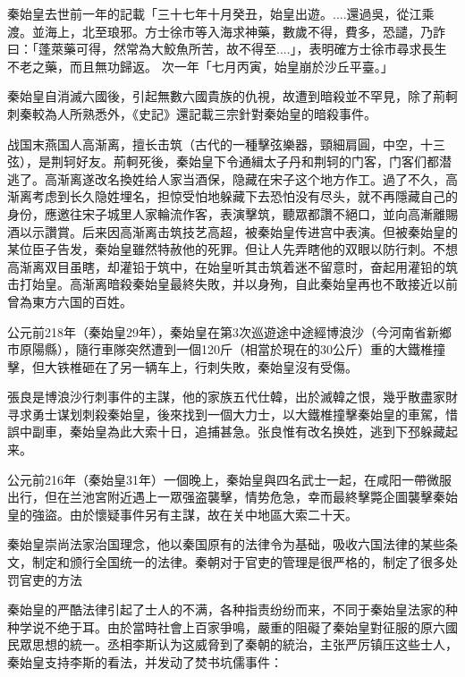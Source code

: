 秦始皇去世前一年的記載「三十七年十月癸丑，始皇出遊。....還過吳，從江乘渡。並海上，北至琅邪。方士徐市等入海求神藥，數歲不得，費多，恐譴，乃詐曰：「蓬萊藥可得，然常為大鮫魚所苦，故不得至....」，表明確方士徐市尋求長生不老之藥，而且無功歸返。 次一年「七月丙寅，始皇崩於沙丘平臺。」

秦始皇自消滅六國後，引起無數六國貴族的仇視，故遭到暗殺並不罕見，除了荊軻刺秦較為人所熟悉外，《史記》還記載三宗針對秦始皇的暗殺事件。

战国末燕国人高渐离，擅长击筑（古代的一種擊弦樂器，頸細肩圓，中空，十三弦），是荆轲好友。荊軻死後，秦始皇下令通緝太子丹和荆轲的门客，门客们都潜逃了。高渐离遂改名換姓给人家当酒保，隐藏在宋子这个地方作工。過了不久，高渐离考虑到长久隐姓埋名，担惊受怕地躲藏下去恐怕没有尽头，就不再隱藏自己的身份，應邀往宋子城里人家輪流作客，表演擊筑，聽眾都讚不絕口，並向高漸離賜酒以示讚賞。后来因高渐离击筑技艺高超，被秦始皇传进宫中表演。但被秦始皇的某位臣子告发，秦始皇雖然特赦他的死罪。但让人先弄瞎他的双眼以防行刺。不想高渐离双目虽瞎，却灌铅于筑中，在始皇听其击筑着迷不留意时，奋起用灌铅的筑击打始皇。高渐离暗殺秦始皇最終失敗，并以身殉，自此秦始皇再也不敢接近以前曾為東方六国的百姓。

公元前218年（秦始皇29年），秦始皇在第3次巡遊途中途經博浪沙（今河南省新鄉市原陽縣），隨行車隊突然遭到一個120斤（相當於現在的30公斤）重的大鐵椎撞擊，但大铁椎砸在了另一辆车上，行刺失敗，秦始皇沒有受傷。

張良是博浪沙行刺事件的主謀，他的家族五代仕韓，出於滅韓之恨，幾乎散盡家財寻求勇士谋划刺殺秦始皇，後來找到一個大力士，以大鐵椎撞擊秦始皇的車駕，惜誤中副車，秦始皇為此大索十日，追捕甚急。张良惟有改名换姓，逃到下邳躲藏起来。

公元前216年（秦始皇31年）一個晚上，秦始皇與四名武士一起，在咸阳一帶微服出行，但在兰池宮附近遇上一眾强盗襲擊，情势危急，幸而最終擊斃企圖襲擊秦始皇的強盜。由於懷疑事件另有主謀，故在关中地區大索二十天。

秦始皇崇尚法家治国理念，他以秦国原有的法律令为基础，吸收六国法律的某些条文，制定和颁行全国统一的法律。秦朝对于官吏的管理是很严格的，制定了很多处罚官吏的方法

秦始皇的严酷法律引起了士人的不满，各种指责纷纷而来，不同于秦始皇法家的种种学说不绝于耳。由於當時社會上百家爭鳴，嚴重的阻礙了秦始皇對征服的原六國民眾思想的統一。丞相李斯认为这威脅到了秦朝的統治，主张严厉镇压这些士人，秦始皇支持李斯的看法，并发动了焚书坑儒事件：


